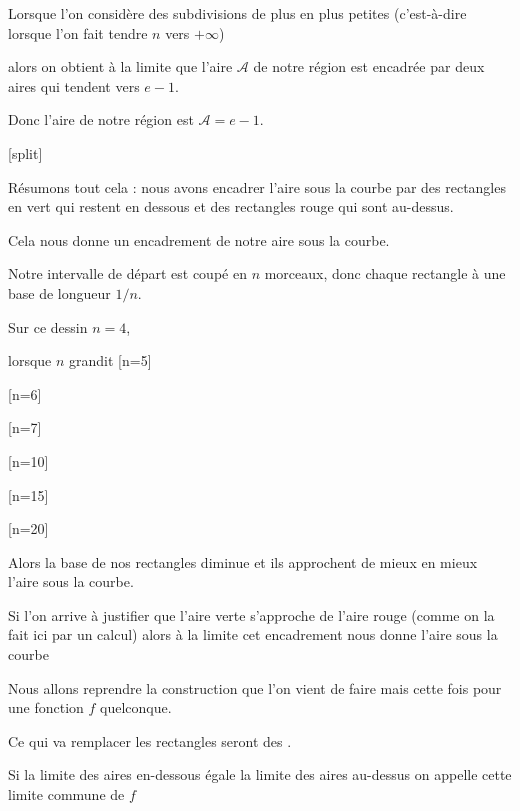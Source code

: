 Lorsque l'on considère des subdivisions de plus en plus petites
(c'est-à-dire lorsque l'on fait tendre $n$ vers $+\infty$) 

alors on obtient à la limite que l'aire $\mathcal{A}$
de notre région est encadrée par deux aires qui tendent vers $e-1$. 

\change

Donc l'aire de notre région est $\mathcal{A} = e-1$.


\bigskip

[split]


Résumons tout cela : nous avons encadrer l'aire sous la courbe 
par des rectangles en vert qui restent en dessous et des rectangles
rouge qui sont au-dessus. 

Cela nous donne un encadrement de notre aire sous la courbe.

Notre intervalle de départ est coupé en $n$ morceaux, donc chaque rectangle
à une base de longueur $1/n$.

Sur ce dessin $n=4$,

\change

lorsque $n$ grandit [n=5]

\change

[n=6]

\change

[n=7]

\change

[n=10]

\change

[n=15]

\change

[n=20]

Alors la base de nos rectangles diminue et ils approchent de mieux en mieux 
l'aire sous la courbe.


Si l'on arrive à justifier que l'aire verte s'approche de l'aire rouge (comme on la fait ici par un calcul)
alors à la limite cet encadrement nous donne l'aire sous la courbe



\diapo

Nous allons reprendre la construction que l'on vient de faire mais cette fois pour une fonction $f$ quelconque.


\change

Ce qui va remplacer les rectangles seront des .

\change

Si la limite des aires en-dessous égale la limite des aires au-dessus on appelle cette limite commune 
 de $f$ 

